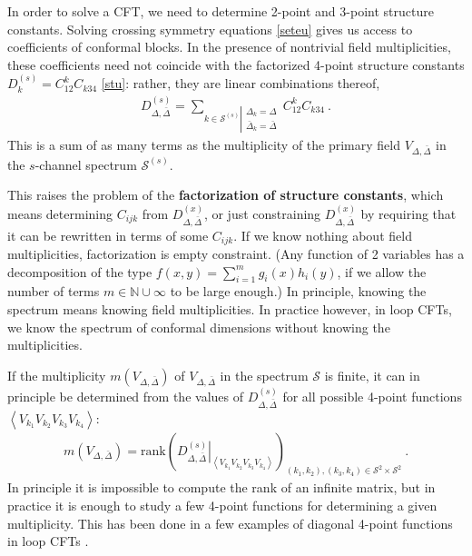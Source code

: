 \documentclass[12pt, a4paper]{article}
\newcommand{\myindex}[1]{\textbf{\boldmath #1}}
\begin{document}
In order to solve a CFT, we need to determine 2-point and 3-point structure constants. Solving crossing symmetry equations \eqref{seteu} gives us access to coefficients of conformal blocks. In the presence of nontrivial field multiplicities, these coefficients need not coincide with the factorized 4-point structure constants $D^{(s)}_k = C^k_{12}C_{k34}$ \eqref{stu}: rather, they are linear combinations thereof,
\begin{align}
 D^{(s)}_{\Delta,\bar\Delta} = \sum_{k\in\mathcal{S}^{(s)}\left|\substack{\Delta_k=\Delta\\ \bar{\Delta}_k=\bar\Delta}\right.} C^k_{12}C_{k34} \ .
 \label{dcc}
\end{align}
This is a sum of as many terms as the multiplicity of the primary field $V_{\Delta,\bar\Delta}$ in the $s$-channel spectrum $\mathcal{S}^{(s)}$.

This raises the problem of the \myindex{factorization of structure constants}, which means determining $C_{ijk}$ from $D^{(x)}_{\Delta,\bar\Delta}$, or just constraining $D^{(x)}_{\Delta,\bar\Delta}$ by requiring that it can be rewritten in terms of some $C_{ijk}$. If we know nothing about field multiplicities, factorization is empty constraint. (Any function of 2 variables has a decomposition of the type $f(x,y)=\sum_{i=1}^m g_i(x)h_i(y)$, if we allow the number of terms $m\in\mathbb{N}\cup \infty$ to be large enough.)
In principle, knowing the spectrum means knowing field multiplicities. In practice however, in loop CFTs, we know the spectrum of conformal dimensions without knowing the multiplicities.

If the multiplicity $m(V_{\Delta,\bar\Delta})$ of $V_{\Delta,\bar\Delta}$ in the spectrum $\mathcal{S}$ is finite, it can in principle be determined from the values of $D^{(s)}_{\Delta,\bar\Delta}$ for all possible 4-point functions $\left<V_{k_1}V_{k_2}V_{k_3}V_{k_4}\right>$:
\begin{align}
 m\left(V_{\Delta,\bar\Delta}\right) = \text{rank}\left(\left.D^{(s)}_{\Delta,\bar\Delta}\right|_{\left<V_{k_1}V_{k_2}V_{k_3}V_{k_4}\right>}\right)_{(k_1,k_2),(k_3,k_4)\in\mathcal{S}^2\times \mathcal{S}^2}\ .
\end{align}
In principle it is impossible to compute the rank of an infinite matrix, but 
in practice it is enough to study a few 4-point functions for determining a given multiplicity. This has been done in a few examples of diagonal 4-point functions in loop CFTs \cite{rib22}.
\end{document}
